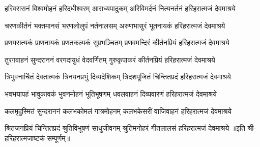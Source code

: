 
\fourlineindentedshloka
{हरिवरासनं विश्वमोहनं}
{हरिदधीश्वरम् आराध्यपादुकम्}
{अरिविमर्दनं नित्यनर्तनं}
{हरिहरात्मजं देवमाश्रये}

\fourlineindentedshloka
{चरणकीर्तनं भक्तमानसं}
{भरणलोलुपं नर्तनालसम्}
{अरुणभासुरं भूतनायकं}
{हरिहरात्मजं देवमाश्रये}

\fourlineindentedshloka
{प्रणयसत्यकं प्राणनायकं}
{प्रणतकल्पकं सुप्रभञ्चितम्}
{प्रणवमन्दिरं कीर्तनप्रियं}
{हरिहरात्मजं देवमाश्रये}

\fourlineindentedshloka
{तुरगवाहनं सुन्दराननं}
{वरगदायुधं वेदवर्णितम्}
{गुरुकृपाकरं कीर्तनप्रियं}
{हरिहरात्मजं देवमाश्रये}

\fourlineindentedshloka
{त्रिभुवनार्चितं देवतात्मकं}
{त्रिनयनप्रभुं दिव्यदेशिकम्}
{त्रिदशपूजितं चिन्तितप्रदं}
{हरिहरात्मजं देवमाश्रये}

\fourlineindentedshloka
{भवभयापहं भावुकावकं}
{भुवनमोहनं भूतिभूषणम्}
{धवलवाहनं दिव्यवारणं}
{हरिहरात्मजं देवमाश्रये}

\fourlineindentedshloka
{कलमृदुस्मितं सुन्दराननं}
{कलभकोमलं गात्रमोहनम्}
{कलभकेसरीं वाजिवाहनं}
{हरिहरात्मजं देवमाश्रये}

\fourlineindentedshloka
{श्रितजनप्रियं चिन्तितप्रदं}
{श्रुतिविभूषणं साधुजीवनम्}
{श्रुतिमनोहरं गीतलालसं}
{हरिहरात्मजं देवमाश्रये}
॥इति श्री-हरिहरात्मजाष्टकं सम्पूर्णम्॥